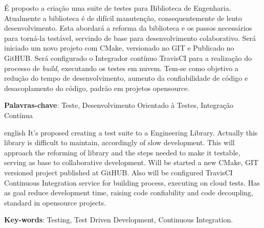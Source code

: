 \documentclass[
	article,			%
	12pt,				%
	oneside,			%
	a4paper,			%
	english,			
	brazil,
	sumario=tradicional
	]{abntex2}
\begin{document}

\frenchspacing 


%
%
\maketitle

\begin{resumoumacoluna}
É proposto a criação uma suite de testes para Biblioteca de Engenharia. Atualmente a biblioteca é de difícil manutenção, consequentemente de lento desenvolvimento. Esta abordará a reforma da biblioteca e os passos necessários para torná-la testável, servindo de base para desenvolvimento colaborativo. Será iniciado um novo projeto com CMake, versionado no GIT e Publicado no GitHUB. Será configurado o Integrador contínuo TravisCI para a realização do processo de \textit{build}, executando os testes em nuvem. Tem-se como objetivo a redução do tempo de desenvolvimento, aumento da confiabilidade de código e desacoplamento do código, padrão em projetos opensource.

 \vspace{\onelineskip}
 
 \noindent
 \textbf{Palavras-chave}: Teste, Desenvolvimento Orientado à Testes, Integração Contínua
\end{resumoumacoluna}

\begin{resumo}[Abstract]
 \begin{otherlanguage*}{english}
   It's proposed creating a test suite to a Engineering Library. Actually this library is difficult to maintain, accordingly of slow development. This will approach the reforming of library and the steps needed to make it testable, serving as base to collaborative development. Will be started a new CMake, GIT versioned project published at GitHUB. Also will be configured TravisCI Continuous Integration service for building process, executing on cloud tests. Has as goal reduce development time, raising code confiability and code decoupling, standard in opensource projects.

   \vspace{\onelineskip}
 
   \noindent 
   \textbf{Key-words}: Testing, Test Driven Development, Continuous Integration.
 \end{otherlanguage*}
\end{resumo}
\end{document}
